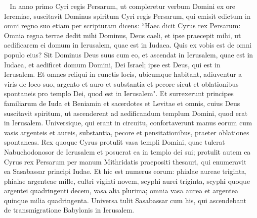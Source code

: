 
\begin{biblechapter}   
\verse In anno primo Cyri regis Persarum, ut compleretur verbum Domini ex ore Ieremiae, suscitavit Dominus spiritum Cyri regis Persarum, qui emisit edictum in omni regno suo etiam per scripturam dicens: 
\verse “Haec dicit Cyrus rex Persarum: Omnia regna terrae dedit mihi Dominus, Deus caeli, et ipse praecepit mihi, ut aedificarem ei domum in Ierusalem, quae est in Iudaea. 
\verse Quis ex vobis est de omni populo eius? Sit Dominus Deus suus cum eo, et ascendat in Ierusalem, quae est in Iudaea, et aedificet domum Domini, Dei Israel; ipse est Deus, qui est in Ierusalem. 
\verse Et omnes reliqui in cunctis locis, ubicumque habitant, adiuventur a viris de loco suo, argento et auro et substantia et pecore sicut et oblationibus spontaneis pro templo Dei, quod est in Ierusalem". 
\verse Et surrexerunt principes familiarum de Iuda et Beniamin et sacerdotes et Levitae et omnis, cuius Deus suscitavit spiritum, ut ascenderent ad aedificandum templum Domini, quod erat in Ierusalem. 
\verse Universique, qui erant in circuitu, confortaverunt manus eorum cum vasis argenteis et aureis, substantia, pecore et pensitationibus, praeter oblationes spontaneas. 
\verse Rex quoque Cyrus protulit vasa templi Domini, quae tulerat Nabuchodonosor de Ierusalem et posuerat ea in templo dei sui; 
\verse protulit autem ea Cyrus rex Persarum per manum Mithridatis praepositi thesauri, qui enumeravit ea Sasabassar principi Iudae. 
\verse Et hic est numerus eorum: phialae aureae triginta, phialae argenteae mille, cultri viginti novem, scyphi aurei triginta, 
\verse scyphi quoque argentei quadringenti decem, vasa alia plurima; 
\verse omnia vasa aurea et argentea quinque milia quadringenta. Universa tulit Sasabassar cum his, qui ascendebant de transmigratione Babylonis in Ierusalem. 
\end{biblechapter}

